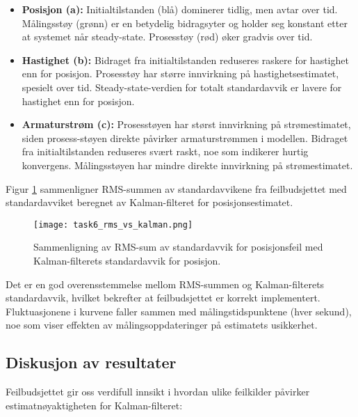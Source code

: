 \documentclass[a4paper,12pt]{article}
\theoremstyle{plain}
\begin{document}
\begin{itemize}
    \item \textbf{Posisjon (a):} Initialtilstanden (blå) dominerer tidlig, men avtar over tid. Målingsstøy (grønn) er en betydelig bidragsyter og holder seg konstant etter at systemet når steady-state. Prosesstøy (rød) øker gradvis over tid.
    
    \item \textbf{Hastighet (b):} Bidraget fra initialtilstanden reduseres raskere for hastighet enn for posisjon. Prosesstøy har større innvirkning på hastighetsestimatet, spesielt over tid. Steady-state-verdien for totalt standardavvik er lavere for hastighet enn for posisjon.
    
    \item \textbf{Armaturstrøm (c):} Prosesstøyen har størst innvirkning på strømestimatet, siden prosess-støyen direkte påvirker armaturstrømmen i modellen. Bidraget fra initialtilstanden reduseres svært raskt, noe som indikerer hurtig konvergens. Målingsstøyen har mindre direkte innvirkning på strømestimatet.
\end{itemize}

Figur \ref{fig:rms_vs_kalman} sammenligner RMS-summen av standardavvikene fra feilbudsjettet med standardavviket beregnet av Kalman-filteret for posisjonsestimatet.

\begin{figure}[!htb]
\centering
\texttt{[image: task6\_rms\_vs\_kalman.png]}
\caption{Sammenligning av RMS-sum av standardavvik for posisjonsfeil med Kalman-filterets standardavvik for posisjon.}
\label{fig:rms_vs_kalman}
\end{figure}

Det er en god overensstemmelse mellom RMS-summen og Kalman-filterets standardavvik, hvilket bekrefter at feilbudsjettet er korrekt implementert. Fluktuasjonene i kurvene faller sammen med målingstidspunktene (hver sekund), noe som viser effekten av målingsoppdateringer på estimatets usikkerhet.

\subsection{Diskusjon av resultater}

Feilbudsjettet gir oss verdifull innsikt i hvordan ulike feilkilder påvirker estimatnøyaktigheten for Kalman-filteret:
\end{document}
